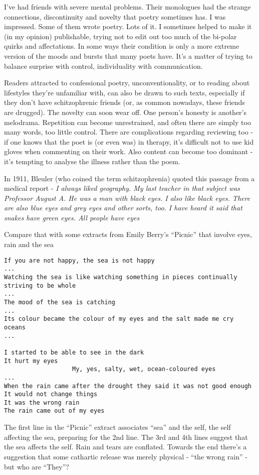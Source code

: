 \documentclass[11pt]{article}
\begin{document}
I've had friends with severe mental problems. Their monologues had the strange connections, discontinuity and novelty that poetry sometimes has. I was impressed. Some of them wrote poetry. Lots of it. I sometimes helped to make it (in my opinion) publishable, trying not to edit out too much of the bi-polar quirks and affectations. In some ways their condition is only a more extreme version of the moods and bursts that many poets have. It's a matter of  trying to balance surprise with control, individuality with communication.


Readers attracted to confessional poetry, unconventionality, or to reading about lifestyles they're unfamiliar with, can also be drawn to such texts, especially if they don't have schitzophrenic friends (or, as common nowadays, these friends are drugged). The novelty can soon wear off. One person's honesty is another's melodrama. Repetition can become unrestrained, and often there are simply too many words, too little control. There are complications regarding reviewing too - if one knows that the poet is (or even was) in therapy, it's difficult not to use kid gloves when commenting on their work. Also content can become too dominant - it's tempting to analyse the illness rather than the poem.


In 1911, Bleuler (who coined the term schitzophrenia) quoted this passage from a medical report -
\textit{I always liked geography. My last teacher in that subject was Professor August A. He was a man with black eyes. I also like black eyes. There are also blue eyes and grey eyes and other sorts, too. I have heard it said that snakes have green eyes. All people have eyes}

Compare that with some extracts from Emily Berry's ``Picnic'' that involve eyes, rain and the sea

\begin{verbatim}
If you are not happy, the sea is not happy 
...
Watching the sea is like watching something in pieces continually striving to be whole
...
The mood of the sea is catching
...
Its colour became the colour of my eyes and the salt made me cry oceans
...

I started to be able to see in the dark
It hurt my eyes
                   My, yes, salty, wet, ocean-coloured eyes
...
When the rain came after the drought they said it was not good enough
It would not change things
It was the wrong rain
The rain came out of my eyes
\end{verbatim}

The first line in the ``Picnic'' extract associates ``sea'' and the self, the self affecting the sea, preparing for the 2nd line. The 3rd and 4th lines suggest that the sea affects the self. Rain and tears are conflated. Towards the end there's a suggestion that some cathartic release was merely physical - ``the wrong rain'' - but who are ``They''?
\end{document}

